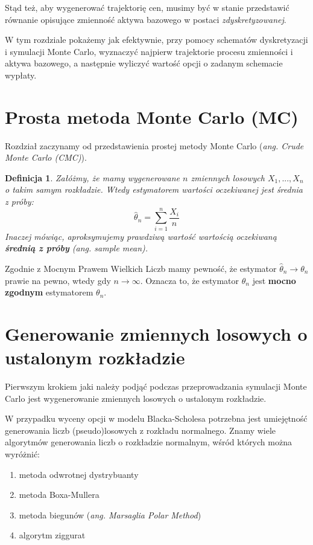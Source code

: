 \documentclass{pracamgr}
\newtheorem{defi}{Definicja}[section]
\begin{document}
Stąd też, aby wygenerować trajektorię cen, musimy być w stanie przedstawić równanie opisujące
zmienność aktywa bazowego w postaci \textit{zdyskretyzowanej}.

W tym rozdziale pokażemy jak efektywnie, przy pomocy schematów dyskretyzacji i symulacji Monte Carlo, 
wyznaczyć najpierw trajektorie procesu zmienności i aktywa bazowego, a następnie wyliczyć wartość opcji o zadanym schemacie wypłaty.

\section{Prosta metoda Monte Carlo (MC)}
\label{sec:mc}

Rozdział zaczynamy od przedstawienia prostej metody Monte Carlo (\textit{ang. Crude Monte Carlo (CMC)}).

\begin{defi}
Załóżmy, że mamy wygenerowane $n$ zmiennych losowych $X_1, ..., X_n$ o takim samym rozkładzie. Wtedy estymatorem wartości
oczekiwanej jest średnia z próby:
\begin{equation}
  \hat{\theta}_n = \sum_{i=1}^n \frac{X_i}{n}
\end{equation}
Inaczej mówiąc, aproksymujemy prawdziwą wartość wartością oczekiwaną \textbf{średnią z próby} (\textit{ang. sample mean}).
\end{defi}


Zgodnie z Mocnym Prawem Wielkich Liczb mamy pewność, że estymator $\hat{\theta}_n \rightarrow \theta_n$ prawie na pewno, wtedy gdy $n \rightarrow \infty$. Oznacza to, że estymator $\hat{\theta}_n $ jest \textbf{mocno zgodnym} estymatorem $\theta_n$.



\section{Generowanie zmiennych losowych o ustalonym rozkładzie}
\label{sec:genRV}

Pierwszym krokiem jaki należy podjąć podczas przeprowadzania symulacji Monte Carlo jest 
wygenerowanie zmiennych losowych o ustalonym rozkładzie.

W przypadku wyceny opcji w modelu Blacka-Scholesa potrzebna jest umiejętność generowania liczb (pseudo)losowych z rozkładu normalnego. Znamy wiele algorytmów generowania liczb o rozkładzie normalnym, wśród których można wyróżnić:
\begin{enumerate}
  \item metoda odwrotnej dystrybuanty
  \item metoda Boxa-Mullera
  \item metoda biegunów (\textit{ang. Marsaglia Polar Method}) \cite{Marsaglia}
  \item algorytm ziggurat
\end{enumerate}
\end{document}
